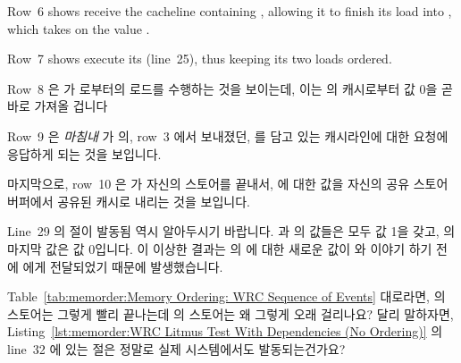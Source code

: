 Row~6 shows  receive the cacheline containing , allowing
it to finish its load into , which takes on the value .

Row~7 shows  execute its  (line~25), thus keeping
its two loads ordered.
\fi

Row~8 은  가  로부터의 로드를 수행하는 것을 보이는데, 이는
 의 캐시로부터 값 0을 곧바로 가져올 겁니다

Row~9 은 \emph{마침내}  가  의, row~3 에서 보내졌던, 
를 담고 있는 캐시라인에 대한 요청에 응답하게 되는 것을 보입니다.

마지막으로, row~10 은  가 자신의 스토어를 끝내서,  에 대한 값을
자신의 공유 스토어 버퍼에서 공유된 캐시로 내리는 것을 보입니다.

Line~29 의  절이 발동됨 역시 알아두시기 바랍니다.
 과  의 값들은 모두 값 1을 갖고,  의 마지막 값은 값
0입니다.
이 이상한 결과는  의  에 대한 새로운 값이  와 이야기
하기 전에  에게 전달되었기 때문에 발생했습니다.

\QuickQuiz{}
	Table~\ref{tab:memorder:Memory Ordering: WRC Sequence of Events}
	대로라면,  의 스토어는 그렇게 빨리 끝나는데  의
	스토어는 왜 그렇게 오래 걸리나요?
	달리 말하자면,
	Listing~\ref{lst:memorder:WRC Litmus Test With Dependencies (No Ordering)}
	의 line~32 에 있는  절은 정말로 실제 시스템에서도
	발동되는건가요?
	\iffalse

